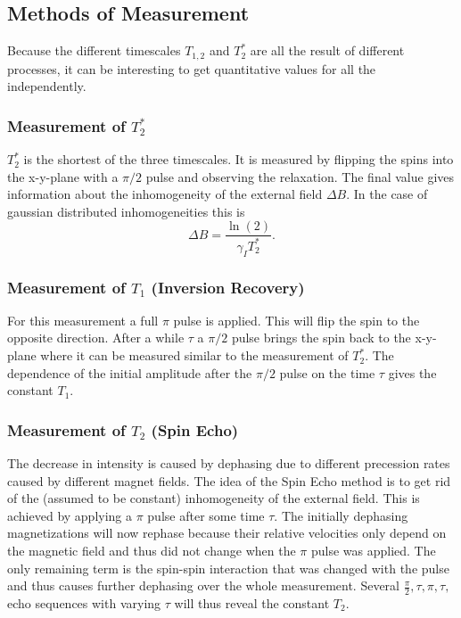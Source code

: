 \documentclass[a4paper]{scrartcl}
\numberwithin{equation}{section}
\numberwithin{figure}{section}
\numberwithin{table}{section}
\newcommand{\eq}[2]{\begin{equation}#1\label{#2}\end{equation}}
\begin{document}
\subsection{Methods of Measurement}
\label{sec:methods}
Because the different timescales $T_{1,2}$ and $T_2^*$ are all the result of different processes, it can be interesting to get quantitative values for all the independently.

\subsubsection*{Measurement of $T_2^*$}
$T_2^*$ is the shortest of the three timescales. It is measured by flipping the spins into the x-y-plane with a $\pi/2$ pulse and observing the relaxation. The final value gives information about the inhomogeneity of the external field ${\Delta B}$. In the case of gaussian distributed inhomogeneities this is
\eq{{\Delta B} = \frac{\ln(2)}{\gamma_I T_2^*} .}{eq:deltaB}

\subsubsection*{Measurement of $T_1$ (Inversion Recovery)}
For this measurement a full $\pi$ pulse is applied. This will flip the spin to the opposite direction. After a while $\tau$ a $\pi/2$ pulse brings the spin back to the x-y-plane where it can be measured similar to the measurement of $T_2^*$. The dependence of the initial amplitude after the $\pi/2$ pulse on the time $\tau$ gives the constant $T_1$.

\subsubsection*{Measurement of $T_2$ (Spin Echo)}
The decrease in intensity is caused by dephasing due to different precession rates caused by different magnet fields. The idea of the Spin Echo method is to get rid of the (assumed to be constant) inhomogeneity of the external field. This is achieved by applying a $\pi$ pulse after some time $\tau$. The initially dephasing magnetizations will now rephase because their relative velocities only depend on the magnetic field and thus did not change when the $\pi$ pulse was applied. The only remaining term is the spin-spin interaction that was changed with the pulse and thus causes further dephasing over the whole measurement. Several $\frac{\pi}{2},\tau,\pi,\tau,$echo sequences with varying $\tau$ will thus reveal the constant $T_2$.
\end{document}
